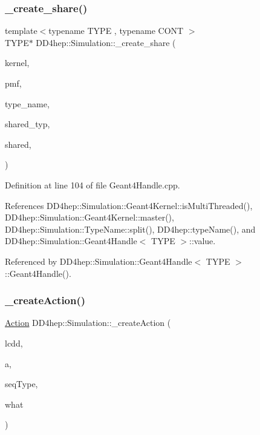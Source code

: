 \subsubsection{\texorpdfstring{\+\_\+create\+\_\+share()}{\_create\_share()}}
{\footnotesize\ttfamily template$<$typename T\+Y\+PE , typename C\+O\+NT $>$ \\
T\+Y\+PE$\ast$ D\+D4hep\+::\+Simulation\+::\+\_\+create\+\_\+share (\begin{DoxyParamCaption}\item[{\hyperlink{class_d_d4hep_1_1_simulation_1_1_geant4_kernel}{Geant4\+Kernel} \&}]{kernel,  }\item[{C\+O\+NT \&(Geant4\+Action\+Container\+::$\ast$)()}]{pmf,  }\item[{const string \&}]{type\+\_\+name,  }\item[{const string \&}]{shared\+\_\+typ,  }\item[{bool}]{shared,  }\item[{T\+Y\+PE $\ast$}]{ }\end{DoxyParamCaption})}



Definition at line 104 of file Geant4\+Handle.\+cpp.



References D\+D4hep\+::\+Simulation\+::\+Geant4\+Kernel\+::is\+Multi\+Threaded(), D\+D4hep\+::\+Simulation\+::\+Geant4\+Kernel\+::master(), D\+D4hep\+::\+Simulation\+::\+Type\+Name\+::split(), D\+D4hep\+::type\+Name(), and D\+D4hep\+::\+Simulation\+::\+Geant4\+Handle$<$ T\+Y\+P\+E $>$\+::value.



Referenced by D\+D4hep\+::\+Simulation\+::\+Geant4\+Handle$<$ T\+Y\+P\+E $>$\+::\+Geant4\+Handle().

\hypertarget{namespace_d_d4hep_1_1_simulation_a21f9fcaa27a71abd2beeabcba2600bda}{}\label{namespace_d_d4hep_1_1_simulation_a21f9fcaa27a71abd2beeabcba2600bda} 
\subsubsection{\texorpdfstring{\+\_\+create\+Action()}{\_createAction()}}
{\footnotesize\ttfamily \hyperlink{namespace_d_d4hep_1_1_simulation_1_1_setup_aa958972310161bf099d9d22e59d257ab}{Action} D\+D4hep\+::\+Simulation\+::\+\_\+create\+Action (\begin{DoxyParamCaption}\item[{\hyperlink{namespace_d_d4hep_a9d7154801ec259f2a1d2fe015d140518}{lcdd\+\_\+t} \&}]{lcdd,  }\item[{\hyperlink{_det_factory_helper_8h_ac13b3c79d2bc9214ff0cf5b8dc43dda6}{xml\+\_\+h}}]{a,  }\item[{const string \&}]{seq\+Type,  }\item[{int}]{what }\end{DoxyParamCaption})}



